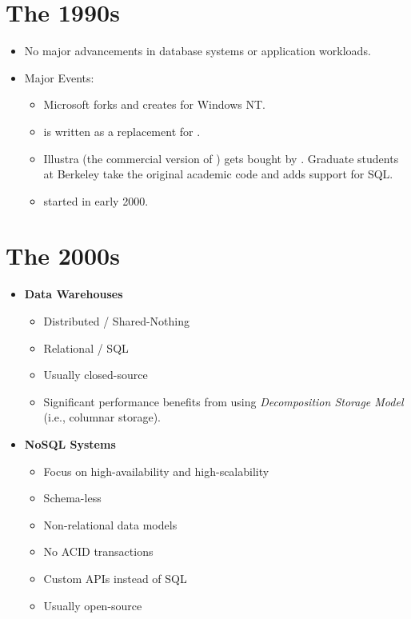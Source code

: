 \documentclass[11pt]{article}
\begin{document}
\section{The 1990s}
\begin{itemize}
    \item No major advancements in database systems or application workloads.
    \item Major Events:
    \begin{itemize}
        \item
        Microsoft forks  and creates  for Windows NT.
        
        \item
         is written as a replacement for .
        
        \item
        Illustra (the commercial version of ) gets bought by . 
        Graduate students at Berkeley take the original academic  code and adds 
        support for SQL.
        
        \item
         started in early 2000.
    \end{itemize}
\end{itemize}

\section{The 2000s}
\begin{itemize}
    \item \textbf{Data Warehouses}
    \begin{itemize}
        \item Distributed / Shared-Nothing
        \item Relational / SQL
        \item Usually closed-source
        \item
        Significant performance benefits from using \textit{Decomposition Storage Model}
        (i.e., columnar storage).
    \end{itemize}
    
    \item \textbf{NoSQL Systems}~\cite{cattell10}
    \begin{itemize}
        \item Focus on high-availability and high-scalability
        \item Schema-less
        \item Non-relational data models
        \item No ACID transactions
        \item Custom APIs instead of SQL
        \item Usually open-source
    \end{itemize}
\end{itemize}
\end{document}
